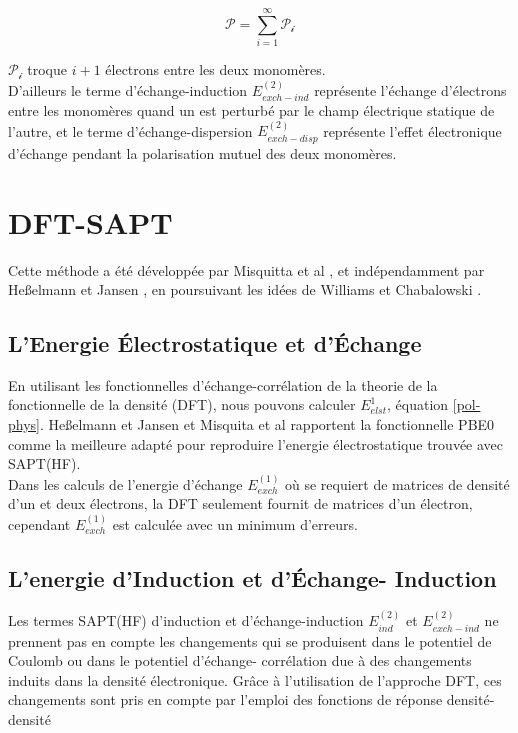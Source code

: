 \begin{equation}
\mathscr{P} = \sum_{i=1}^{\infty} \mathscr{P_{i}}
\end{equation}

$\mathscr{P_{i}}$ troque $i+1$ électrons entre les deux monomères.\\

D'ailleurs le terme d'échange-induction $E_{exch-ind}^{(2)}$ représente l'échange d'électrons entre les monomères quand un est perturbé par le champ électrique statique de l'autre, et le terme d'échange-dispersion $E_{exch-disp}^{(2)}$ représente l'effet électronique d'échange pendant la polarisation mutuel des deux monomères.   


\section{DFT-SAPT}

Cette méthode a été développée par Misquitta et al \cite{misquitta2005intermolecular}, et indépendamment par Heßelmann et Jansen \cite{hesselmann2002first}, en poursuivant les idées de Williams et Chabalowski \cite{williams2001using}. 

\subsection{L'Energie Électrostatique et d'Échange }

En utilisant les fonctionnelles d'échange-corrélation de la theorie de la fonctionnelle de la densité (DFT), nous pouvons calculer $E_{elst}^{1}$, équation \ref{pol-phys}. Heßelmann et Jansen \cite{hesselmann2002first} et Misquita et al \cite{misquitta2005symmetry} rapportent la fonctionnelle PBE0 comme la meilleure adapté pour reproduire l'energie électrostatique trouvée avec SAPT(HF).\\

Dans les calculs de l'energie d'échange $E_{exch}^{(1)}$ où se requiert de matrices de densité d'un et deux électrons, la DFT seulement fournit de matrices d'un électron, cependant $E_{exch}^{(1)}$ est calculée avec un minimum d'erreurs. 

\subsection{L'energie d'Induction et d'Échange- Induction}

Les termes SAPT(HF) d'induction et d'échange-induction $E_{ind}^{(2)}$ et $E_{exch-ind}^{(2)}$ ne prennent pas en compte les changements qui se produisent dans le potentiel de Coulomb ou dans le potentiel d'échange- corrélation due à des changements induits dans la densité électronique. Grâce à l'utilisation de l'approche DFT, ces changements sont pris en compte par l'emploi des fonctions de réponse densité- densité \cite{jansen2001comment}

